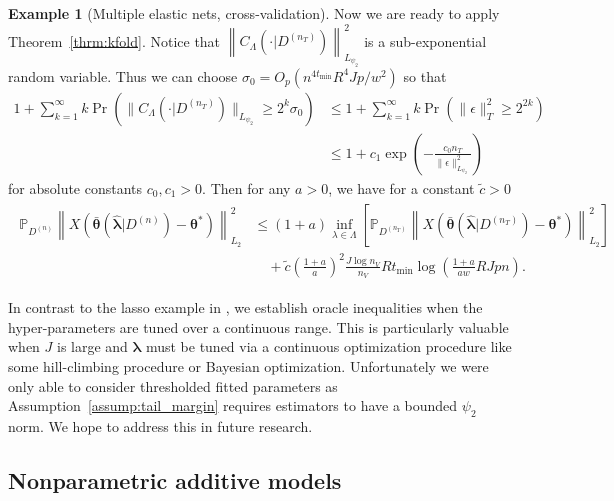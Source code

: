 \documentclass[12pt]{article} %
\theoremstyle{definition}
\newtheorem{example}{Example}
\begin{document}
\begin{example}[Multiple elastic nets, cross-validation]
	Now we are ready to apply Theorem~\ref{thrm:kfold}.
	Notice that
	$\left \| C_\Lambda(\cdot | D^{(n_T)}) \right \|_{L_{\psi_2}}^2$
	is a sub-exponential random variable.
	Thus we can choose $\sigma_0 = O_p(n^{4t_{\min}}R^4Jp/w^2 )$ so that
	\begin{align}
	1 + \sum_{k = 1}^\infty k \Pr \left (
	\| C_\Lambda(\cdot | D^{(n_T)}) \|_{L_{\psi_2}}
	\ge 2^k \sigma_0
	\right )
	& \le
	1 + \sum_{k = 1}^\infty k \Pr \left (
	\| \epsilon\|_T^2 \ge
	2^{2k}
	\right )\\
	& \le
	1 + c_1
	\exp \left (
	- \frac{c_0 n_T}{\|\epsilon\|^2_{L_{\psi_{2}}}}
	\right )
	\end{align}
	for absolute constants $c_0, c_1 > 0$.
	Then for any $a > 0$, we have for a constant $\tilde{c} > 0$
	\begin{align}
	\begin{split}
	\mathbb{P}_{D^{(n)}}
	\left \|
	X \left(
	\bar{\boldsymbol{\theta}}(\hat{\boldsymbol{\lambda}}|D^{(n)})
	- \boldsymbol{\theta}^*
	\right)
	\right \|_{L_{2}}^{2}
	& \le	(1+a)
	\inf_{\lambda\in\Lambda}
	\left[
	\mathbb{P}_{D^{(n_{T})}}
	\left \|
	X \left(
	\bar{\boldsymbol{\theta}}(\hat{\boldsymbol{\lambda}}|D^{(n_T)})
	- \boldsymbol{\theta}^*
	\right)
	\right \|_{L_{2}}^{2}
	\right] \\
	& \quad +
	\tilde{c}
	\left (\frac{1+a}{a} \right )^2
	\frac{J \log n_{V}}{n_{V}}
	R t_{\min}
	\log\left(
	\frac{1+a}{aw} RJpn
	\right).
	\end{split}
	\end{align}
	
	
	In contrast to the lasso example in \citet{lecue2012oracle}, we establish oracle inequalities when the hyper-parameters are tuned over a continuous range.
	This is particularly valuable when $J$ is large and $\boldsymbol{\lambda}$ must be tuned via a continuous optimization procedure like some hill-climbing procedure or Bayesian optimization.
	Unfortunately we were only able to consider thresholded fitted parameters as Assumption~\ref{assump:tail_margin} requires estimators to have a bounded $\psi_2$ norm. We hope to address this in future research.
\end{example}

\subsection{Nonparametric additive models}
\label{sec:nonparam_smooth}
\end{document}
